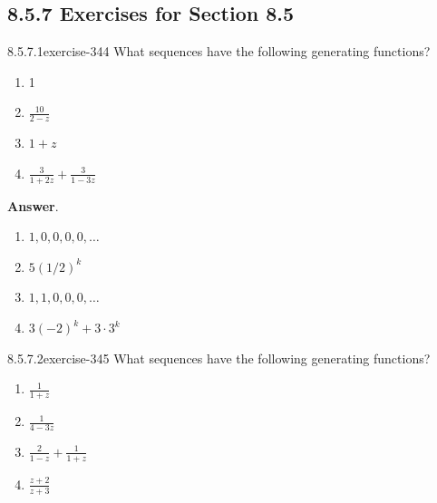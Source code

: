 \documentclass[twoside,10pt,]{book}
\numberwithin{equation}{section}
\begin{document}
\subsection*{8.5.7 Exercises for Section 8.5}
\begin{divisionsolution}{8.5.7.1}{}{exercise-344}%
\hypertarget{p-2950}{}%
What sequences have the following generating functions?%
\par
\hypertarget{p-2951}{}%
\leavevmode%
\begin{enumerate}[label=(\alph*)]
\item\hypertarget{li-1437}{}\hypertarget{p-2952}{}%
1%
\item\hypertarget{li-1438}{}\hypertarget{p-2953}{}%
\(\frac{10}{2-z}\)%
\item\hypertarget{li-1439}{}\hypertarget{p-2954}{}%
\(1 + z\)%
\item\hypertarget{li-1440}{}\hypertarget{p-2955}{}%
\(\frac{3}{1+2z}+ \frac{3}{1-3z}\)%
\end{enumerate}
%
\par\smallskip%
\noindent\textbf{Answer}.\quad%
\hypertarget{p-2956}{}%
\leavevmode%
\begin{enumerate}[label=(\alph*)]
\item\hypertarget{li-1441}{}\hypertarget{p-2957}{}%
\(1,0,0,0,0,\ldots\)%
\item\hypertarget{li-1442}{}\hypertarget{p-2958}{}%
\(5(1/2)^k\)%
\item\hypertarget{li-1443}{}\hypertarget{p-2959}{}%
\(1,1,0,0,0,\ldots\)%
\item\hypertarget{li-1444}{}\hypertarget{p-2960}{}%
\(3(-2)^k+3\cdot 3^k\)%
\end{enumerate}
%
\end{divisionsolution}%
\begin{divisionsolution}{8.5.7.2}{}{exercise-345}%
\hypertarget{p-2961}{}%
What sequences have the following generating functions?%
\par
\hypertarget{p-2962}{}%
\leavevmode%
\begin{enumerate}[label=(\alph*)]
\item\hypertarget{li-1445}{}\hypertarget{p-2963}{}%
\(\frac{1}{1+z}\)%
\item\hypertarget{li-1446}{}\hypertarget{p-2964}{}%
\(\frac{1}{4-3z}\)%
\item\hypertarget{li-1447}{}\hypertarget{p-2965}{}%
\(\frac{2}{1-z}+ \frac{1}{1+z}\)%
\item\hypertarget{li-1448}{}\hypertarget{p-2966}{}%
\(\frac{z+2}{z+3}\)%
\end{enumerate}
%
\end{divisionsolution}%
\end{document}
